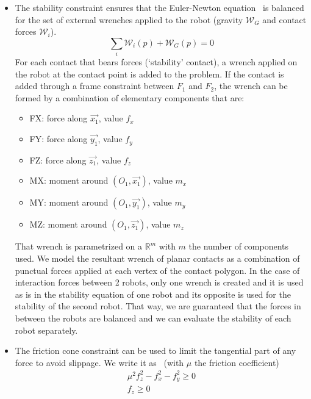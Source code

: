 \begin{itemize}
\item The stability constraint ensures that the Euler-Newton equation~ is balanced for the set of external wrenches applied to the robot (gravity $\mathcal{W}_G$ and contact forces $\mathcal{W}_i$).
\begin{equation}
  \sum_{i}{\mathcal{W}_i(p)} + {\mathcal{W}_G(p)} = 0
  \label{eq:NewtonWrench}
\end{equation}
For each contact that bears forces (`stability' contact), a wrench applied on the robot at the contact point is added to the problem.
If the contact is added through a frame constraint between $F_1$ and $F_2$, the wrench can be formed by a combination of elementary components that are:
\begin{itemize}
\item FX: force along $\vec{x_1}$, value $f_x$
\item FY: force along $\vec{y_1}$, value $f_y$
\item FZ: force along $\vec{z_1}$, value $f_z$
\item MX: moment around $(O_1,\vec{x_1})$, value $m_x$
\item MY: moment around $(O_1,\vec{y_1})$, value $m_y$
\item MZ: moment around $(O_1,\vec{z_1})$, value $m_z$
\end{itemize}
That wrench is parametrized on a $\mathbb{R}^m$ with $m$ the number of components used.
We model the resultant wrench of planar contacts as a combination of punctual forces applied at each vertex of the contact polygon.
In the case of interaction forces between 2 robots, only one wrench is created and it is used as is in the stability equation of one robot and its opposite is used for the stability of the second robot.
That way, we are guaranteed that the forces in between the robots are balanced and we can evaluate the stability of each robot separately.

\item The friction cone constraint can be used to limit the tangential part of any force to avoid slippage.
We write it as~ (with $\mu$ the friction coefficient)
\begin{equation}
  \begin{split}
    \mu^2f_z^2-f_x^2-f_y^2 \geq 0 \\
    f_z \geq 0
  \end{split}
  \label{eq:friction}
\end{equation}


\end{itemize}
